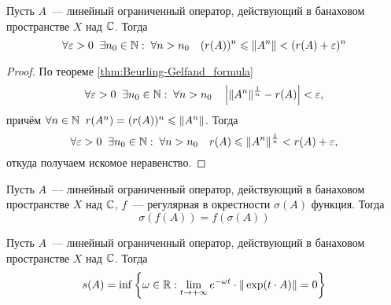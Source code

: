 \begin{corollary}
    \label{cor:spectral_radius_norm_bounds}
    Пусть $ A $~--- линейный ограниченный оператор, действующий в банаховом пространстве $ X $ над $ \mathbb{C} $.
    Тогда
    \[
        \forall \varepsilon > 0 \;\; \exists n_0 \in \mathbb{N}: \; \forall n > n_0 \quad (r(A))^n \leqslant \| A^n \| < (r(A) + \varepsilon)^n
    \]
\end{corollary}

\begin{proof}
    По теореме \ref{thm:Beurling-Gelfand_formula}
    \[
        \forall \varepsilon > 0 \;\; \exists n_0 \in \mathbb{N}: \; \forall n > n_0 \quad \left| \| A^n \|^{\frac{1}{n}} - r(A) \right| < \varepsilon,
    \]
    причём $ \forall n \in \mathbb{N} \;\; r(A^n) = (r(A))^n \leqslant \| A^n \| $.
    Тогда
    \[
        \forall \varepsilon > 0 \;\; \exists n_0 \in \mathbb{N}: \; \forall n > n_0 \quad r(A) \leqslant \| A^n \|^{\frac{1}{n}} < r(A) + \varepsilon,
    \]
    откуда получаем искомое неравенство.
\end{proof}

\begin{theorem}
    \label{thm:spectral_mapping_theorem}
    Пусть $ A $~--- линейный ограниченный оператор, действующий в банаховом пространстве $ X $ над $ \mathbb{C} $,
    $ f $~--- регулярная в окрестности $ \sigma(A) $ функция.
    Тогда
    \begin{equation}
        \label{eq:spectral_mapping_theorem}
        \sigma(f(A)) = f(\sigma(A))
    \end{equation}
\end{theorem}

\begin{lemma}
    \label{lem:operator_exponential_norm_convergence}
    Пусть $ A $~--- линейный ограниченный оператор, действующий в банаховом пространстве $ X $ над $ \mathbb{C} $. %
    Тогда
    \[
        s(A) = \inf \left \{ \omega \in \mathbb{R}: \lim_{t \to +\infty} e^{-\omega t} \cdot \| \exp(t \cdot A) \| = 0 \right \}
    \]
\end{lemma}

